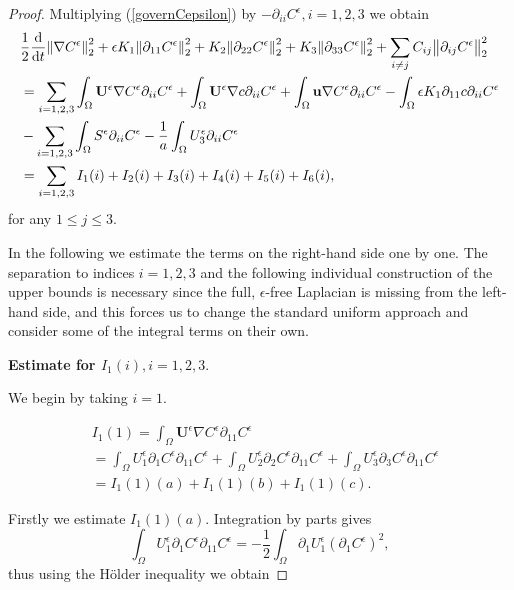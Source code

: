 \documentclass[11pt]{article}
\newcommand*\diff{\mathop{}\!\mathrm{d}}
\begin{document}
\begin{proof}
Multiplying (\ref{governCepsilon}) by $- \partial_{ii} C^\epsilon, i=1,2,3$ we obtain
%
\begin{equation}
\begin{split}
& \frac{1}{2}\frac{\diff}{\diff t} \norm{\nabla C^\epsilon}_2^2 + \epsilon K_1 \norm{\partial_{11} C^\epsilon}_2^2 + K_2 \norm{\partial_{22} C^\epsilon}_2^2 + K_3 \norm{\partial_{33} C^\epsilon}_2^2 + \sum_{i \neq j} C_{ij} \norm{\partial_{ij} C^\epsilon}_2^2 \\
& = \sum_{i = 1,2,3} \int_\Omega \mathbf{U}^\epsilon \nabla C^\epsilon \partial_{ii} C^\epsilon + \int_\Omega \mathbf{U}^\epsilon \nabla c \partial_{ii} C^\epsilon + \int_\Omega \mathbf{u} \nabla C^\epsilon \partial_{ii} C^\epsilon - \int_\Omega \epsilon K_1 \partial_{11} c \partial_{ii} C^\epsilon \\
& - \sum_{i = 1,2,3} \int_\Omega S^\epsilon \partial_{ii} C^\epsilon - \frac{1}{a} \int_\Omega U_3^\epsilon \partial_{ii} C^\epsilon \\
& = \sum_{i = 1,2,3} I_1(i) + I_2(i) + I_3(i) + I_4(i) + I_5(i) + I_6(i),
\end{split}
\end{equation}
%
for any $1 \leq j \leq 3.$

In the following we estimate the terms on the right-hand side one by one. The separation to indices $i = 1,2,3$ and the following individual construction of the upper bounds is necessary since the full, $\epsilon$-free Laplacian is missing from the left-hand side, and this forces us to change the standard uniform approach and consider some of the integral terms on their own.

\bigskip

\textbf{Estimate for $I_1(i), i = 1,2,3.$}

We begin by taking $i=1.$

\begin{equation}
\begin{split}
& I_1(1) = \int_\Omega \mathbf{U}^\epsilon \nabla C^\epsilon \partial_{11} C^\epsilon \\
& = \int_\Omega U_1^\epsilon \partial_1 C^\epsilon \partial_{11} C^\epsilon + \int_\Omega U_2^\epsilon \partial_2 C^\epsilon \partial_{11} C^\epsilon + \int_\Omega U_3^\epsilon \partial_3 C^\epsilon \partial_{11} C^\epsilon \\
& = I_1(1)(a) + I_1(1)(b) + I_1(1)(c).
\end{split}
\end{equation}

Firstly we estimate $I_1(1)(a).$ Integration by parts gives
%
$$\int_\Omega U_1^\epsilon \partial_1 C^\epsilon \partial_{11} C^\epsilon = - \frac{1}{2} \int_\Omega \partial_1 U_1^\epsilon (\partial_1 C^\epsilon)^2,$$
%
thus using the H\"older inequality we obtain


\end{proof}
\end{document}
